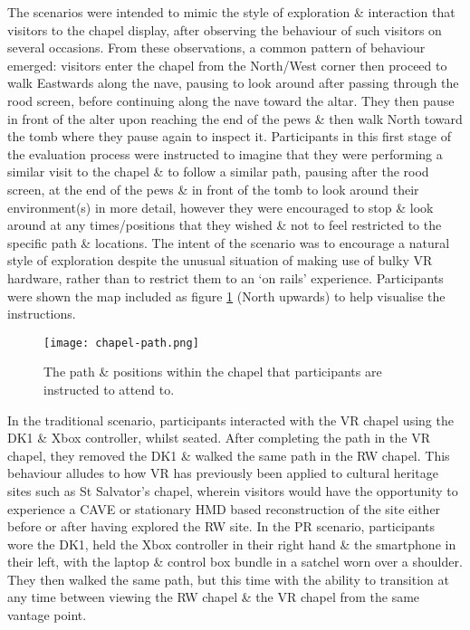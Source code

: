 The scenarios were intended to mimic the style of exploration \& interaction that visitors to the chapel display, after observing the behaviour of such visitors on several occasions. From these observations, a common pattern of behaviour emerged: visitors enter the chapel from the North/West corner then proceed to walk Eastwards along the nave, pausing to look around after passing through the rood screen, before continuing along the nave toward the altar. They then pause in front of the alter upon reaching the end of the pews \& then walk North toward the tomb where they pause again to inspect it. Participants in this first stage of the evaluation process were instructed to imagine that they were performing a similar visit to the chapel \& to follow a similar path, pausing after the rood screen, at the end of the pews \& in front of the tomb to look around their environment(s) in more detail, however they were encouraged to stop \& look around at any times/positions that they wished \& not to feel restricted to the specific path \& locations. The intent of the scenario was to encourage a natural style of exploration despite the unusual situation of making use of bulky VR hardware, rather than to restrict them to an `on rails' experience. Participants were shown the map included as figure \ref{chapel-path} (North upwards) to help visualise the instructions.

\begin{figure}[h]
	\begin{center}
		\texttt{[image: chapel-path.png]}
		\caption{The path \& positions within the chapel that participants are instructed to attend to.}
		\label{chapel-path}
	\end{center}
\end{figure}

In the traditional scenario, participants interacted with the VR chapel using the DK1 \& Xbox controller, whilst seated. After completing the path in the VR chapel, they removed the DK1 \& walked the same path in the RW chapel. This behaviour alludes to how VR has previously been applied to cultural heritage sites such as St Salvator's chapel, wherein visitors would have the opportunity to experience a CAVE or stationary HMD based reconstruction of the site either before or after having explored the RW site. In the PR scenario, participants wore the DK1, held the Xbox controller in their right hand \& the smartphone in their left, with the laptop \& control box bundle in a satchel worn over a shoulder. They then walked the same path, but this time with the ability to transition at any time between viewing the RW chapel \& the VR chapel from the same vantage point.

